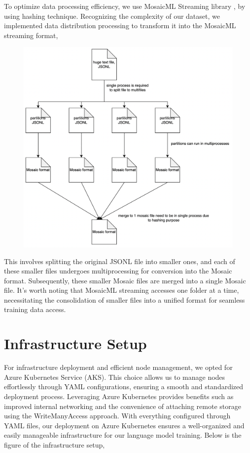\documentclass[preprint]{article}
\begin{document}
To optimize data processing efficiency, we use MosaicML Streaming library \cite{mosaicml2022streaming}, by using hashing technique. Recognizing the complexity of our dataset, we implemented data distribution processing to transform it into the MosaicML streaming format,

\begin{figure}[h]
  \centering
  \includegraphics[width=0.6\linewidth]{pic/how-to-mosaic.png} %
\end{figure}

This involves splitting the original JSONL file into smaller ones, and each of these smaller files undergoes multiprocessing for conversion into the Mosaic format. Subsequently, these smaller Mosaic files are merged into a single Mosaic file. It's worth noting that MosaicML streaming accesses one folder at a time, necessitating the consolidation of smaller files into a unified format for seamless training data access.

\section{Infrastructure Setup}

For infrastructure deployment and efficient node management, we opted for Azure Kubernetes Service (AKS). This choice allows us to manage nodes effortlessly through YAML configurations, ensuring a smooth and standardized deployment process. Leveraging Azure Kubernetes provides benefits such as improved internal networking and the convenience of attaching remote storage using the WriteManyAccess approach. With everything configured through YAML files, our deployment on Azure Kubernetes ensures a well-organized and easily manageable infrastructure for our language model training. Below is the figure of the infrastructure setup,
\end{document}

